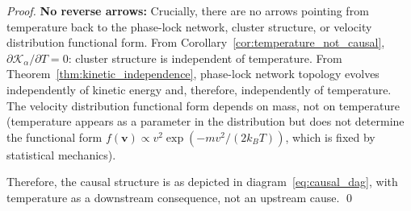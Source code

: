 \documentclass[12pt,a4paper]{article}
\theoremstyle{definition}
\theoremstyle{remark}
\begin{document}
\begin{proof}
\textbf{No reverse arrows:}
Crucially, there are no arrows pointing from temperature back to the phase-lock network, cluster structure, or velocity distribution functional form. From Corollary~\ref{cor:temperature_not_causal}, $\partial \mathcal{K}_\alpha / \partial T = 0$: cluster structure is independent of temperature. From Theorem~\ref{thm:kinetic_independence}, phase-lock network topology evolves independently of kinetic energy and, therefore, independently of temperature. The velocity distribution functional form depends on mass, not on temperature (temperature appears as a parameter in the distribution but does not determine the functional form $f(\mathbf{v}) \propto v^2 \exp(-mv^2/(2k_BT))$, which is fixed by statistical mechanics).

Therefore, the causal structure is as depicted in diagram~\eqref{eq:causal_dag}, with temperature as a downstream consequence, not an upstream cause. \qed
\end{proof}
\end{document}
